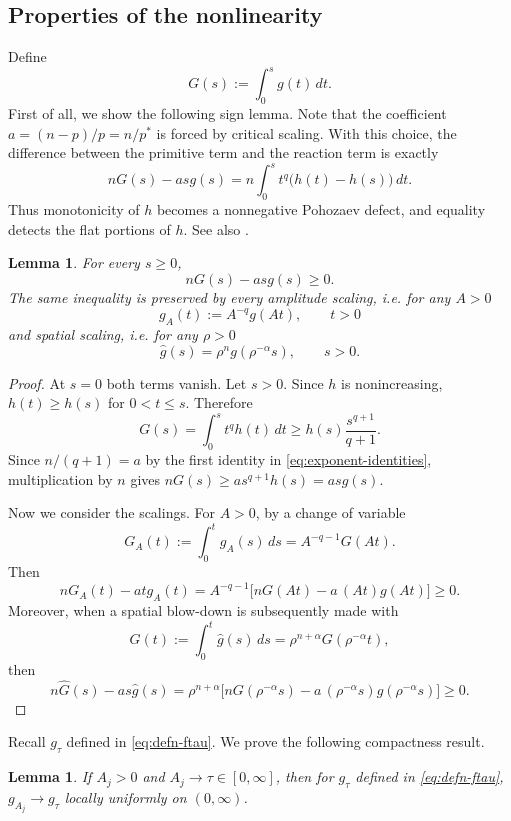 \documentclass[reqno,12pt]{amsart}
\numberwithin{equation}{section}
\newtheorem{lem}[thm]{Lemma}
\theoremstyle{remark}
\newcommand{\dd}{\,d}
\begin{document}
\subsection{Properties of the nonlinearity}
Define
$$
G(s):=\int_0^sg(t)\dd t.
$$
First of all, we show the following sign lemma. Note that the coefficient $a=(n-p)/p=n/p^*$ is forced by critical
scaling.  With this choice, the difference between the primitive term and the reaction term is exactly
$$
 nG(s)-asg(s)
 =n\int_0^s t^q\bigl(h(t)-h(s)\bigr)\,dt.
$$
Thus monotonicity of $h$ becomes a nonnegative Pohozaev defect, and equality detects the flat portions of $h$. See also \cite[Lemma 3.3]{QZ2026}. 

\begin{lem} 
For every $s\ge0$,
\begin{equation}\label{eq:pohozaev-sign}
nG(s)-a s g(s)\ge0.
\end{equation}
The same inequality is preserved by every amplitude scaling, i.e. for any $A>0$ 
$$g_A(t):=A^{-q} g(At), \qquad t>0$$
and spatial scaling, i.e. for any $\rho>0$
$$\widehat g(s)=\rho^n g(\rho^{-\alpha} s),\qquad s>0.$$
\end{lem}

\begin{proof}
At $s=0$ both terms vanish.  Let $s>0$.  Since $h$ is nonincreasing, $h(t)\ge h(s)$ for $0<t\le s$.  Therefore
$$
 G(s)=\int_0^st^qh(t)\dd t  \ge h(s)\frac{s^{q+1}}{q+1}.
$$
Since $n/(q+1)=a$ by the first identity in \eqref{eq:exponent-identities}, multiplication by $n$ gives
$nG(s)\ge a s^{q+1}h(s)=a s g(s)$.

Now we consider the scalings. 
For $A>0$, by a change of variable
$$
G_A(t):=\int_0^t g_A(s)\dd s=A^{-q-1}G(At).
$$
Then
$$
 n G_A(t)-a t g_A(t) =A^{-q-1}\bigl[nG(At)-a\,(At)g(At)\bigr]\ge0.
$$
Moreover, when a spatial blow-down is subsequently made with
$$
\widehat G(t):=\int_0^t \widehat g(s) \dd s=\rho^{n+\alpha}G(\rho^{-\alpha}t),
$$
then
$$
 n\widehat G(s)-a s\widehat g(s)
 =\rho^{n+\alpha} \bigl[nG(\rho^{-\alpha}s) -a\,(\rho^{-\alpha}s)g(\rho^{-\alpha}s)\bigr]\ge 0.
$$
\end{proof}

Recall $g_\tau$ defined in \eqref{eq:defn-ftau}.
We prove the following compactness result. 
\begin{lem}\label{lem:frozen-convergence}
If $A_j>0$ and $A_j\to\tau\in[0,\infty]$, then for $g_\tau$ defined in \eqref{eq:defn-ftau}, 
$g_{A_j}\to g_\tau$ locally uniformly on  $(0,\infty)$.
\end{lem}
\end{document}
